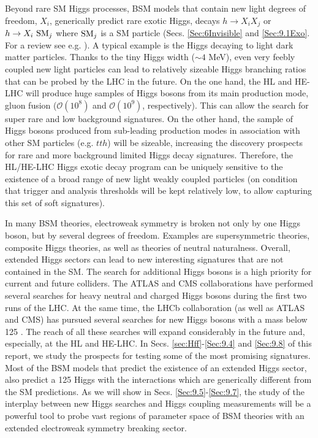Beyond rare SM Higgs processes, BSM models that contain new light degrees of freedom, $X_i$, generically predict rare exotic Higgs, decays $h\to X_i X_j$ or $h\to X_i ~{\rm{SM}}_j$ where ${\rm{SM}}_j$ is a SM particle (Secs. \ref{Sec:6Invisible} and \ref{Sec:9.1Exo}. For a review see e.g. \cite{Curtin:2013fra}). A typical example is the Higgs decaying to light dark matter particles. Thanks to the tiny Higgs width ($\sim 4$ MeV), even very feebly coupled new light particles can lead to relatively sizeable Higgs branching ratios that can be probed by the LHC in the future. On the one hand, the HL and HE-LHC will produce huge samples of Higgs bosons from its main production mode, gluon fusion ($\mathcal O(10^8)$ and $\mathcal O(10^9)$, respectively). This can allow the search for super rare and low background signatures. On the other hand, the sample of Higgs bosons produced from sub-leading  production modes in association with other SM particles (e.g. $tth$) will be sizeable, increasing the discovery prospects for rare and more background limited Higgs decay signatures. 
Therefore, the HL/HE-LHC Higgs exotic decay program can be uniquely sensitive to the existence of a broad range of new light weakly coupled particles (on condition that trigger and analysis thresholds will be kept relatively low, to allow capturing this set of soft signatures).


In many BSM theories, electroweak symmetry is broken not only by one Higgs boson, but by several degrees of freedom. Examples are supersymmetric theories, composite Higgs theories, as well as theories of neutral naturalness. Overall, extended Higgs sectors can lead to new interesting signatures that are not contained in the SM. The search for additional Higgs bosons is a high priority for current and future colliders. The ATLAS and CMS collaborations have performed several searches for heavy neutral and charged Higgs bosons during the first two runs of the LHC. At the same time, the LHCb collaboration (as well as ATLAS and CMS) has pursued several searches for new Higgs bosons with a mass below 125 \UGeV.  The reach of all these searches will expand considerably in the future and, especially, at the HL and HE-LHC. In Secs. \ref{sec:Hff}-\ref{Sec:9.4} and \ref{Sec:9.8} of this report, we study the prospects for testing some of the most promising signatures.
Most of the BSM models that predict the existence of an extended Higgs sector, also predict a 125 \UGeV Higgs with the interactions which are generically different from the SM predictions. As we will show in Secs. \ref{Sec:9.5}-\ref{Sec:9.7}, the study of the interplay between new Higgs searches and Higgs coupling measurements will be a powerful tool to probe vast regions of parameter space of BSM theories with an extended electroweak symmetry breaking sector.
